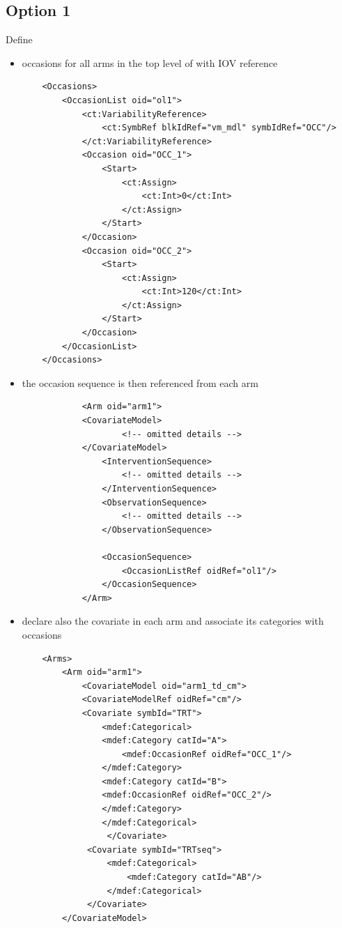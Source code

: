 \subsection{Option 1}
Define 
\begin{itemize}
\item 
occasions for all arms in the top level of  with IOV reference
\lstset{language=XML}
\begin{lstlisting}
    <Occasions>
        <OccasionList oid="ol1">
            <ct:VariabilityReference>
                <ct:SymbRef blkIdRef="vm_mdl" symbIdRef="OCC"/>
            </ct:VariabilityReference>
            <Occasion oid="OCC_1">
                <Start>
                    <ct:Assign>
                        <ct:Int>0</ct:Int>
                    </ct:Assign>
                </Start>
            </Occasion>
            <Occasion oid="OCC_2">
                <Start>
                    <ct:Assign>
                        <ct:Int>120</ct:Int>
                    </ct:Assign>
                </Start>
            </Occasion>
        </OccasionList>
    </Occasions>
\end{lstlisting}
\item
the occasion sequence is then referenced from each arm
\lstset{language=XML}
\begin{lstlisting}
            <Arm oid="arm1">
	        <CovariateModel>
                    <!-- omitted details -->
	        </CovariateModel>
                <InterventionSequence>
                    <!-- omitted details -->
                </InterventionSequence>
                <ObservationSequence>
                    <!-- omitted details -->
                </ObservationSequence>
                
                <OccasionSequence>
                    <OccasionListRef oidRef="ol1"/>
                </OccasionSequence> 
            </Arm>
\end{lstlisting}
\item
declare also the  covariate in each arm and associate its categories with occasions
\lstset{language=XML}
\begin{lstlisting}
	<Arms>
	    <Arm oid="arm1">
	        <CovariateModel oid="arm1_td_cm">
		    <CovariateModelRef oidRef="cm"/>
		    <Covariate symbId="TRT">
		        <mdef:Categorical>
			    <mdef:Category catId="A">
			        <mdef:OccasionRef oidRef="OCC_1"/>
			    </mdef:Category>
			    <mdef:Category catId="B">
				<mdef:OccasionRef oidRef="OCC_2"/>
			    </mdef:Category>
		        </mdef:Categorical>
	             </Covariate>
		     <Covariate symbId="TRTseq">
		         <mdef:Categorical>
		             <mdef:Category catId="AB"/>
		         </mdef:Categorical>
		     </Covariate>
		</CovariateModel>
\end{lstlisting}
\end{itemize}


